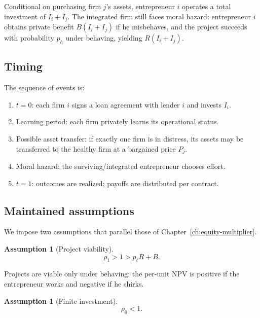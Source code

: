\documentclass[11pt,a4paper,oneside]{book}
\theoremstyle{plain}
\theoremstyle{definition}
\newtheorem{assumption}[theorem]{Assumption}
\theoremstyle{remark}
\numberwithin{equation}{chapter}
\begin{document}
Conditional on purchasing firm $j$'s assets, entrepreneur $i$ operates a total investment of $I_i + I_j$.
The integrated firm still faces moral hazard: entrepreneur $i$ obtains private benefit $B(I_i + I_j)$ if he misbehaves, and the project succeeds with probability $p_h$ under behaving, yielding $R(I_i + I_j)$.

\subsection{Timing}

The sequence of events is:
\begin{enumerate}
  \item $t = 0$: each firm $i$ signs a loan agreement with lender $i$ and invests $I_i$.
  \item Learning period: each firm privately learns its operational status.
  \item Possible asset transfer: if exactly one firm is in distress, its assets may be transferred to the healthy firm at a bargained price $P_j$.
  \item Moral hazard: the surviving/integrated entrepreneur chooses effort.
  \item $t = 1$: outcomes are realized; payoffs are distributed per contract.
\end{enumerate}

\subsection{Maintained assumptions}

We impose two assumptions that parallel those of Chapter~\ref{ch:equity-multiplier}.

\begin{assumption}[Project viability]\label{ass:ma-viability}
\begin{equation}\label{eq:ma-viability}
  \rho_1 > 1 > p_\ell R + B.
\end{equation}
\end{assumption}

Projects are viable only under behaving: the per-unit NPV is positive if the entrepreneur works and negative if he shirks.

\begin{assumption}[Finite investment]\label{ass:ma-finite}
\begin{equation}\label{eq:ma-finite}
  \rho_0 < 1.
\end{equation}
\end{assumption}
\end{document}

